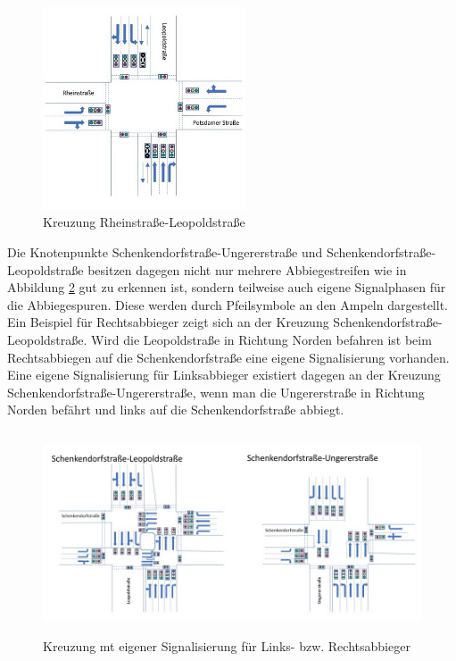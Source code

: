 \begin{savenotes}
	\begin{figure}[H]
		\centering
		\includegraphics[width=6cm,height=6cm]{figures/Rhein_Leo}
		\caption[Kreuzung Rheinstraße-Leopoldstraße]{Kreuzung Rheinstraße-Leopoldstraße \parencite[S. 28]{Kutsch.05.04.2018}}\label{fig:Rhein_Leo}
	\end{figure}
\end{savenotes}

Die Knotenpunkte Schenkendorfstraße-Ungererstraße und Schenkendorfstraße-Leopoldstraße besitzen dagegen nicht nur mehrere Abbiegestreifen wie in Abbildung \ref{fig:eigene_Signalisierung}
gut zu erkennen ist, sondern teilweise auch eigene Signalphasen für die Abbiegespuren. Diese werden durch Pfeilsymbole an den Ampeln dargestellt. Ein Beispiel für Rechtsabbieger zeigt sich an der Kreuzung Schenkendorfstraße-Leopoldstraße. Wird die Leopoldstraße in Richtung Norden befahren ist beim Rechtsabbiegen auf die Schenkendorfstraße eine eigene Signalisierung vorhanden. Eine eigene Signalisierung für Linksabbieger existiert dagegen an der Kreuzung Schenkendorfstraße-Ungererstraße, wenn man die Ungererstraße in Richtung Norden befährt und links auf die Schenkendorfstraße abbiegt.

\begin{savenotes}
	\begin{figure}[H]
		\centering
		\includegraphics[width=12cm,height=6cm]{figures/Kreuzungen_eigene_Abbiegephase}
		\caption[Kreuzungen mit eigener Signalisierung für Links- bzw. Rechtsabbieger]{Kreuzung mt eigener Signalisierung für Links- bzw. Rechtsabbieger \parencite[S. 30f]{Kutsch.05.04.2018}}\label{fig:eigene_Signalisierung}
	\end{figure}
\end{savenotes}

